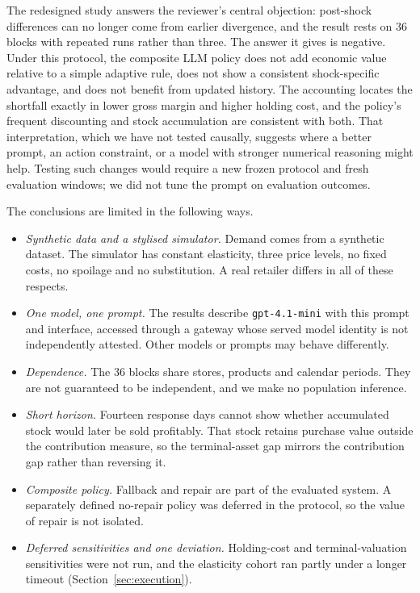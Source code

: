 \documentclass[runningheads]{llncs}
\begin{document}
The redesigned study answers the reviewer's central objection: post-shock differences can no longer come from earlier divergence, and the result rests on 36 blocks with repeated runs rather than three. The answer it gives is negative. Under this protocol, the composite LLM policy does not add economic value relative to a simple adaptive rule, does not show a consistent shock-specific advantage, and does not benefit from updated history. The accounting locates the shortfall exactly in lower gross margin and higher holding cost, and the policy's frequent discounting and stock accumulation are consistent with both. That interpretation, which we have not tested causally, suggests where a better prompt, an action constraint, or a model with stronger numerical reasoning might help. Testing such changes would require a new frozen protocol and fresh evaluation windows; we did not tune the prompt on evaluation outcomes.

The conclusions are limited in the following ways.
\begin{itemize}
\item \emph{Synthetic data and a stylised simulator.} Demand comes from a synthetic dataset. The simulator has constant elasticity, three price levels, no fixed costs, no spoilage and no substitution. A real retailer differs in all of these respects.
\item \emph{One model, one prompt.} The results describe \texttt{gpt-4.1-mini} with this prompt and interface, accessed through a gateway whose served model identity is not independently attested. Other models or prompts may behave differently.
\item \emph{Dependence.} The 36 blocks share stores, products and calendar periods. They are not guaranteed to be independent, and we make no population inference.
\item \emph{Short horizon.} Fourteen response days cannot show whether accumulated stock would later be sold profitably. That stock retains purchase value outside the contribution measure, so the terminal-asset gap mirrors the contribution gap rather than reversing it.
\item \emph{Composite policy.} Fallback and repair are part of the evaluated system. A separately defined no-repair policy was deferred in the protocol, so the value of repair is not isolated.
\item \emph{Deferred sensitivities and one deviation.} Holding-cost and terminal-valuation sensitivities were not run, and the elasticity cohort ran partly under a longer timeout (Section~\ref{sec:execution}).
\end{itemize}
\end{document}
